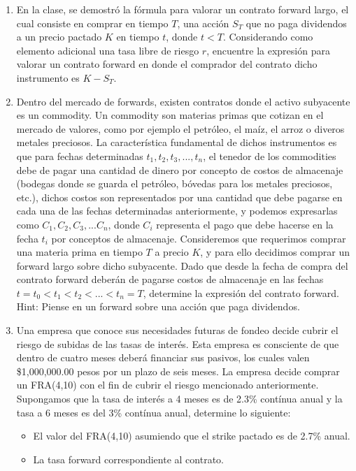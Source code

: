 \documentclass{article}
\begin{document}
\begin{enumerate}
\item En la clase, se demostró la fórmula para valorar un contrato forward largo,
el cual consiste en comprar en tiempo $T$, una acción $S_T$ que no paga dividendos a un precio
pactado $K$ en tiempo $t$, donde $t < T$. Considerando como elemento adicional una tasa libre de 
riesgo $r$, encuentre la expresión para valorar un contrato forward en donde el comprador del contrato
dicho instrumento es $K-S_T$.
\item Dentro del mercado de forwards, existen contratos donde el activo subyacente es un commodity. Un commodity son materias primas
 que cotizan en el mercado de valores, como por ejemplo el petróleo, el maíz, el arroz o diveros metales preciosos. La característica fundamental 
 de dichos instrumentos es que para fechas determinadas $t_1, t_2,t_3,..., t_n$, el tenedor de los commodities debe de pagar una cantidad de dinero por concepto de costos
 de almacenaje (bodegas donde se guarda el petróleo, bóvedas para los metales preciosos, etc.), dichos costos son representados por una cantidad
 que debe pagarse en cada una de las fechas determinadas anteriormente, y podemos expresarlas como $C_1,C_2,C_3,...C_n$, donde $C_i$ representa
 el pago que debe hacerse en la fecha $t_i$ por conceptos de almacenaje. Consideremos que requerimos comprar una materia prima en tiempo
 $T$ a precio $K$, y para ello decidimos comprar un forward largo sobre dicho subyacente. Dado que desde la fecha de compra del contrato forward
 deberán de pagarse costos de almacenaje en las fechas $t=t_0 < t_1<t_2 <...<t_n = T$, determine la expresión del contrato forward. Hint: Piense en un forward
 sobre una acción que paga dividendos. 
\item Una empresa que conoce sus necesidades futuras de fondeo
decide cubrir el riesgo de subidas de las tasas de interés. Esta empresa es
consciente de que dentro de cuatro meses deberá financiar sus pasivos, los cuales valen
\$1,000,000.00 pesos por un plazo de seis meses.
La empresa decide comprar un FRA(4,10) con el fin de cubrir el riesgo mencionado anteriormente.
Supongamos que la tasa de interés a 4 meses es de 2.3\% contínua anual y la tasa a 6 meses es del 3\% contínua anual, determine lo siguiente:
\begin{itemize}
    \item El valor del FRA(4,10) asumiendo que el strike pactado es de 2.7\% anual.
    \item La tasa forward correspondiente al contrato.
\end{itemize}


\end{enumerate}
\end{document}

